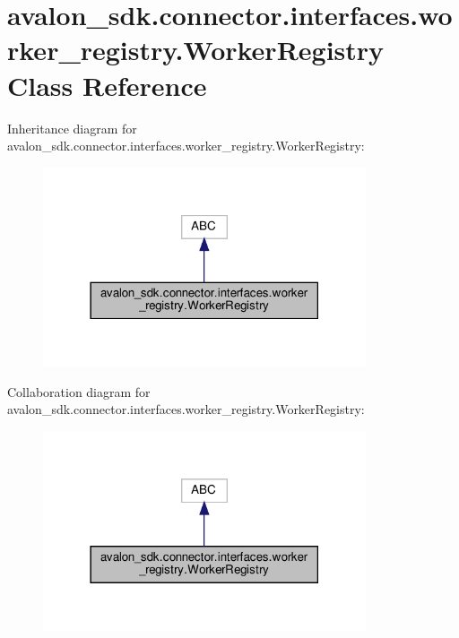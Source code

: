 \hypertarget{classavalon__sdk_1_1connector_1_1interfaces_1_1worker__registry_1_1WorkerRegistry}{}\section{avalon\+\_\+sdk.\+connector.\+interfaces.\+worker\+\_\+registry.\+Worker\+Registry Class Reference}
\label{classavalon__sdk_1_1connector_1_1interfaces_1_1worker__registry_1_1WorkerRegistry}


Inheritance diagram for avalon\+\_\+sdk.\+connector.\+interfaces.\+worker\+\_\+registry.\+Worker\+Registry\+:
\nopagebreak
\begin{figure}[H]
\begin{center}
\leavevmode
\includegraphics[width=270pt]{classavalon__sdk_1_1connector_1_1interfaces_1_1worker__registry_1_1WorkerRegistry__inherit__graph}
\end{center}
\end{figure}


Collaboration diagram for avalon\+\_\+sdk.\+connector.\+interfaces.\+worker\+\_\+registry.\+Worker\+Registry\+:
\nopagebreak
\begin{figure}[H]
\begin{center}
\leavevmode
\includegraphics[width=270pt]{classavalon__sdk_1_1connector_1_1interfaces_1_1worker__registry_1_1WorkerRegistry__coll__graph}
\end{center}
\end{figure}
